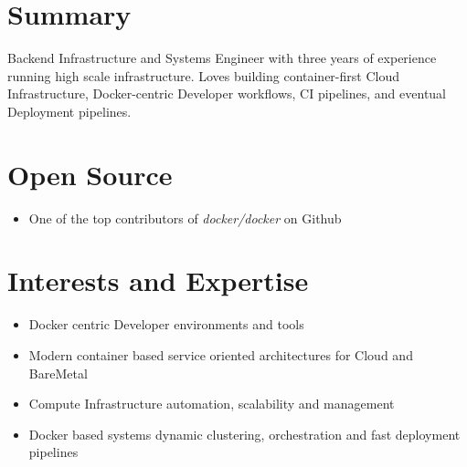\documentclass[margin]{res}
\begin{document}

\address{ \textbf{Web}:\hspace{1mm}\href{http://ankush.io/}{ankush.io}\hspace{5mm} \textbf{Github}:\hspace{1mm}\href{https://github.com/ankushagarwal}{ankushagarwal}\hspace{5mm}      \textbf{Email}:\hspace{1mm}\href{mailto:ankushagarwal11@gmail.com}{ankushagarwal11@gmail.com} }

\begin{resume}

\section{Summary}

  Backend Infrastructure and Systems Engineer with three years of experience running high scale infrastructure. Loves building container-first Cloud Infrastructure, Docker-centric Developer workflows, CI pipelines, and eventual Deployment pipelines.

\section{Open Source}
 \begin{itemize} \itemsep -2pt  %
 \item One of the top contributors of \textit{docker/docker} on Github
 \end{itemize}

\section{Interests and Expertise}
 \begin{itemize} \itemsep -2pt  %
  \item Docker centric Developer environments and tools 
 \item Modern container based service oriented architectures for Cloud and BareMetal
 \item Compute Infrastructure automation, scalability and management
 \item Docker based systems dynamic clustering, orchestration and fast deployment pipelines
 \end{itemize}


\end{resume}
\end{document}
